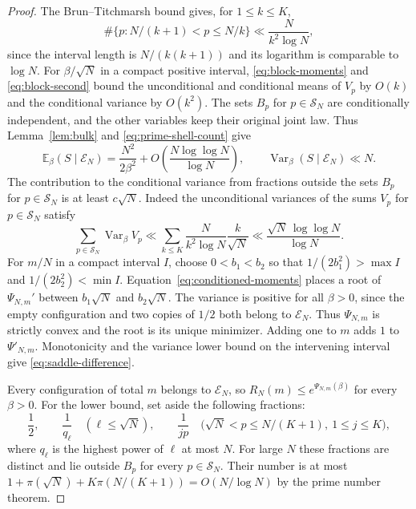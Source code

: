 \documentclass[11pt]{amsart}
\theoremstyle{remark}
\DeclareMathOperator{\Var}{Var}
\newcommand{\Ee}{\mathbb E}
\begin{document}
\begin{proof}
The Brun--Titchmarsh bound \cite[(1.12)]{montgomery-vaughan-sieve} gives, for \(1\le k\le K\),
\begin{equation}
 \#\{p:N/(k+1)<p\le N/k\}\ll \frac{N}{k^2\log N},
 \label{eq:prime-shell-count}
\end{equation}
since the interval length is \(N/(k(k+1))\) and its logarithm is comparable to \(\log N\). For \(\beta/\sqrt N\) in a compact positive interval, \eqref{eq:block-moments} and \eqref{eq:block-second} bound the unconditional and conditional means of \(V_p\) by \(O(k)\) and the conditional variance by \(O(k^2)\). The sets \(B_p\) for \(p\in\mathcal S_N\) are conditionally independent, and the other variables keep their original joint law. Thus Lemma~\ref{lem:bulk} and \eqref{eq:prime-shell-count} give
\begin{equation}
 \Ee_\beta(S\mid \mathcal E_N)=\frac{N^2}{2\beta^2}
       +O\!\left(\frac{N\log\log N}{\log N}\right),
 \qquad \Var_\beta(S\mid \mathcal E_N)\ll N .
 \label{eq:conditioned-moments}
\end{equation}
The contribution to the conditional variance from fractions outside the sets \(B_p\) for \(p\in\mathcal S_N\) is at least \(c\sqrt N\). Indeed the unconditional variances of the sums \(V_p\) for \(p\in\mathcal S_N\) satisfy
\[
 \sum_{p\in\mathcal S_N}\Var_\beta V_p
 \ll \sum_{k\le K}\frac{N}{k^2\log N}\frac{k}{\sqrt N}
 \ll \frac{\sqrt N\,\log\log N}{\log N}.
\]
For \(m/N\) in a compact interval \(I\), choose \(0<b_1<b_2\) so that \(1/(2b_1^2)>\max I\) and \(1/(2b_2^2)<\min I\). Equation~\eqref{eq:conditioned-moments} places a root of \(\Psi_{N,m}'\) between \(b_1\sqrt N\) and \(b_2\sqrt N\). The variance is positive for all \(\beta>0\), since the empty configuration and two copies of \(1/2\) both belong to \(\mathcal E_N\). Thus \(\Psi_{N,m}\) is strictly convex and the root is its unique minimizer. Adding one to \(m\) adds \(1\) to \(\Psi'_{N,m}\). Monotonicity and the variance lower bound on the intervening interval give \eqref{eq:saddle-difference}.

Every configuration of total \(m\) belongs to \(\mathcal E_N\), so \(R_N(m)\le e^{\Psi_{N,m}(\beta)}\) for every \(\beta>0\). For the lower bound, set aside the following fractions:
\[
 \frac12,\qquad
 \frac1{q_\ell}\quad(\ell\le\sqrt N),\qquad
 \frac1{jp}\quad\bigl(\sqrt N<p\le N/(K+1),\ 1\le j\le K\bigr),
\]
where \(q_\ell\) is the highest power of \(\ell\) at most \(N\). For large \(N\) these fractions are distinct and lie outside \(B_p\) for every \(p\in\mathcal S_N\). Their number is at most \(1+\pi(\sqrt N)+K\pi(N/(K+1))=O(N/\log N)\)
by the prime number theorem.


\end{proof}
\end{document}
